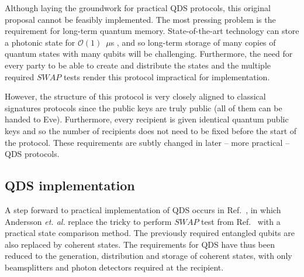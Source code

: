 

Although laying the groundwork for practical QDS protocols, this original proposal cannot be feasibly implemented. The most pressing problem is the requirement for long-term quantum memory. State-of-the-art technology can store a photonic state for $\mathcal{O}\left(1\right)$~$\mu$s \cite{Wang2019d}, and so long-term storage of many copies of quantum states with many qubits will be challenging. Furthermore, the need for every party to be able to create and distribute the states and the multiple required $SWAP$ tests render this protocol impractical for implementation. 

However, the structure of this protocol is very closely aligned to classical signatures protocols since the public keys are truly public (all of them can be handed to Eve). Furthermore, every recipient is given identical quantum public keys and so the number of recipients does not need to be fixed before the start of the protocol. These requirements are subtly changed in later -- more practical -- QDS protocols. %


\subsection{QDS implementation}
A step forward to practical implementation of QDS occurs in Ref.~\cite{Andersson2006}, in which Andersson \emph{et. al.} replace the tricky to perform $SWAP$ test from Ref.~\cite{Gottesman2001} with a practical state comparison method. The previously required entangled qubits are also replaced by coherent states. The requirements for QDS have thus been reduced to the generation, distribution and storage of coherent states, with only beamsplitters and photon detectors required at the recipient. 

